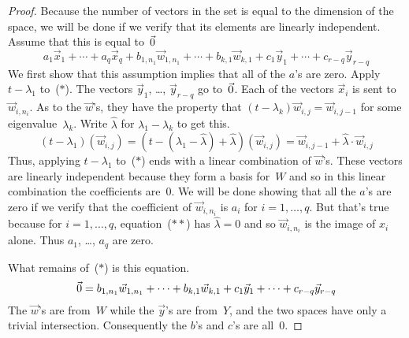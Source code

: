 \begin{proof}
Because the number of vectors in the set
is equal to the dimension of the space, 
we will be done if we verify that its elements are linearly independent.
Assume that this is equal to~$\vec{0}$
\begin{equation*}
  a_1\vec{x}_1+\cdots+a_q\vec{x}_q   
    +b_{1,n_1}\vec{w}_{1,n_1}+\cdots+b_{k,1}\vec{w}_{k,1} 
    +c_1\vec{y}_1+\cdots+c_{r-q}\vec{y}_{r-q}
  \tag{$*$}
\end{equation*}
We first show that this assumption implies that
all of the $a$'s are zero.
Apply $t-\lambda_1$ to~($*$).
The vectors $\vec{y}_1$, \ldots, $\vec{y}_{r-q}$ 
go to~$\vec{0}$.
Each of the vectors $\vec{x}_i$ is sent to 
$\vec{w}_{i,n_i}$.
As to the $\vec{w}$'s, they have the property that
$(t-\lambda_k)\vec{w}_{i,j}=\vec{w}_{i,j-1}$ 
for some eigenvalue~$\lambda_k$.
Write $\hat{\lambda}$ for $\lambda_1-\lambda_k$ to get this.
\begin{equation*}
  (t-\lambda_1)(\vec{w}_{i,j})
    =(t-(\lambda_1-\hat{\lambda})+\hat{\lambda})(\vec{w}_{i,j})
    =\vec{w}_{i,j-1}+\hat{\lambda}\cdot\vec{w}_{i,j} 
  \tag{$**$}
\end{equation*}
Thus, applying $t-\lambda_1$ to~($*$) ends with a 
linear combination of $\vec{w}$'s.
These vectors are linearly independent because
they form a basis for~$W$ and so in this linear combination 
the coefficients are~$0$.
We will be done showing that all the $a$'s are zero if
we verify that 
the coefficient of $\vec{w}_{i,n_i}$ is $a_i$ for $i=1,\ldots,q$.
But that's true because for $i=1,\ldots,q$, 
equation~($**$) has $\hat{\lambda}=0$
and so $\vec{w}_{i,n_i}$ is the image of $x_{i}$ alone.
Thus $a_1$, \ldots, $a_q$ are zero. 

What remains of~($*$) is this equation.
\begin{equation*}
  \vec{0}
  =
    b_{1,n_1}\vec{w}_{1,n_1}+\cdots+b_{k,1}\vec{w}_{k,1}
    +c_1\vec{y}_1+\cdots+c_{r-q}\vec{y}_{r-q}
\end{equation*}
The $\vec{w}$'s are from~$W$ while the $\vec{y}$'s are from~$Y$, and the
two spaces have only a trivial intersection.
Consequently the $b$'s and $c$'s are all~$0$.
\end{proof}




